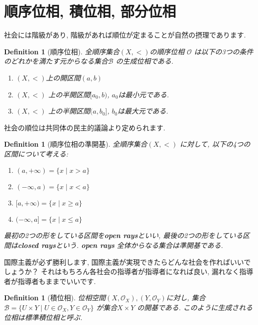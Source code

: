 \documentclass[lualatex]{ltjsbook}
\newtheorem{definition}[theorem]{Definition}
\theoremstyle{remark}
\theoremstyle{plain}
\begin{document}
\section{順序位相,  積位相,  部分位相}

社会には階級があり,  階級があれば順位が定まることが自然の摂理であります.
\begin{definition}[順序位相]
全順序集合$(X, <)$の順序位相 $\mathcal{O}$ は以下の3つの条件のどれかを満たす元からなる集合$\mathcal{B}$ の生成位相である.

\begin{enumerate}
	\item $\left( X,  < \right) $上の開区間$\left( a, b \right) $
	\item $\left( X, < \right) $ 上の半開区間$[a_0, b)$,  $a_0$は最小元である.
	\item  $\left( X,  < \right) $ 上の半開区間$(a, b_0]$,  $b_0$は最大元である.
\end{enumerate}

\end{definition}

社会の順位は共同体の民主的議論より定められます.

\begin{definition}[順序位相の準開基]
全順序集合$\left( X, < \right) $ に対して,  以下の4つの区間について考える:
	\begin{enumerate}
		\item $(a, +\infty)=\{x  \mid x>a	\}$
		\item $(-\infty ,  a)= \{ x  \mid  x< a \}$
		\item $[a, +\infty)= \{ x \mid x \ge a \}$
		\item  $(-\infty, a]= \{x  \mid x \le a \}$
	\end{enumerate}
	最初の2つの形をしている区間を\textbf{open rays}といい,  最後の2つの形をしている区間は\textbf{closed rays}という.
	\textbf{open rays} 全体からなる集合は準開基である.
\end{definition}

国際主義が必ず勝利します,  国際主義が実現できたらどんな社会を作ればいいでしょうか？ それはもちろん各社会の指導者が指導者になれば良い,  漏れなく指導者が指導者もままでいいです.

\begin{definition}[積位相]
	位相空間$(X, \mathcal{O}_X), (Y, \mathcal{O}_Y)$に対し,   
	集合$\mathcal{B}=\{ U \times Y  \mid U \in \mathcal{O}_X,  Y \in \mathcal{O}_Y\}$ が集合$X \times Y$ の開基である.
	このように生成される位相は標準積位相と呼ぶ.
\end{definition}
\end{document}
